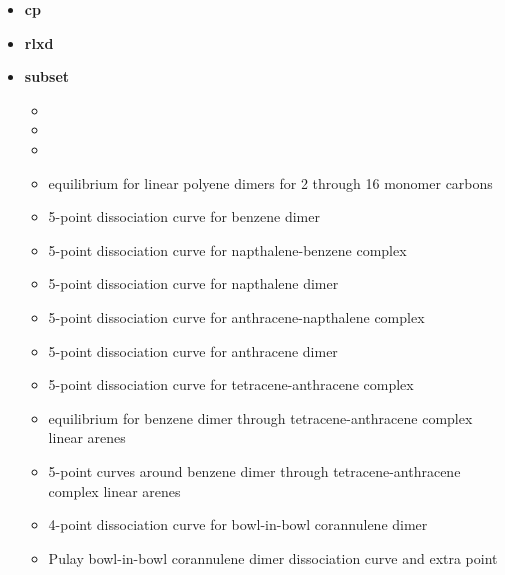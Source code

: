 \documentclass[letterpaper,10pt,english]{sphinxmanual}
\begin{document}
\begin{itemize}
\item {} 
\textbf{cp}   \textbar{}\textbar{} 

\item {} 
\textbf{rlxd} 

\item {} 
\textbf{subset}
\begin{itemize}
\item {} 

\item {} 

\item {} 

\item {} 
 equilibrium for linear polyene dimers for 2 through 16 monomer carbons

\item {} 
 5-point dissociation curve for benzene dimer

\item {} 
 5-point dissociation curve for napthalene-benzene complex

\item {} 
 5-point dissociation curve for napthalene dimer

\item {} 
 5-point dissociation curve for anthracene-napthalene complex

\item {} 
 5-point dissociation curve for anthracene dimer

\item {} 
 5-point dissociation curve for tetracene-anthracene complex

\item {} 
 equilibrium for benzene dimer through tetracene-anthracene complex linear arenes

\item {} 
 5-point curves around benzene dimer through tetracene-anthracene complex linear arenes

\item {} 
 4-point dissociation curve for bowl-in-bowl corannulene dimer

\item {} 
 Pulay bowl-in-bowl corannulene dimer dissociation curve and extra point


\end{itemize}
\end{itemize}
\end{document}
